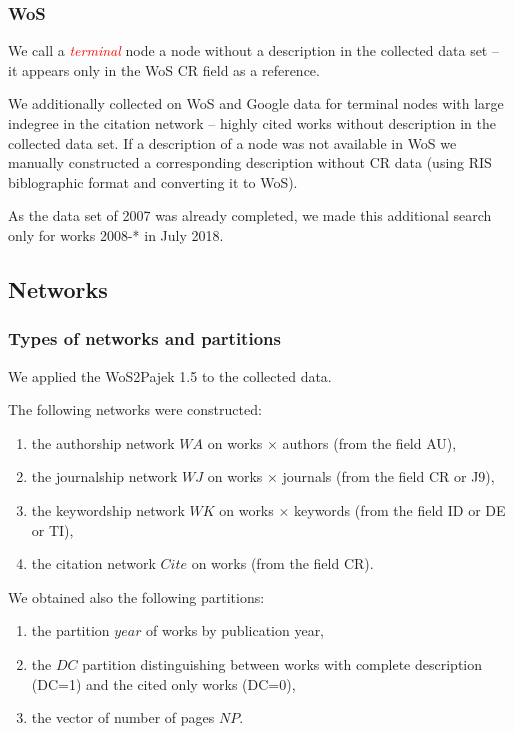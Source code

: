 \documentclass[hyperref={pdfstartview={FitBH -32768},
                         pdfpagemode=FullScreen,
                         plainpages=false,
                         colorlinks=true}
              ]{beamer}
\newcommand{\keyw}[1]{\textcolor{red}{\emph{#1}}}
\begin{document}
\begin{frame}[fragile]
\frametitle{WoS}
\small
We call a \keyw{terminal} node  a node without a description in the collected data set -- it appears only in the WoS CR field as a reference. \medskip

We additionally collected on WoS and Google data for terminal nodes with large indegree in the citation network -- highly cited works without description in the collected data set. If a description of a node was not available in WoS we manually constructed a corresponding description without CR data (using RIS biblographic format and converting it to WoS).\medskip

As the data set of 2007 was already completed, we made this additional search only for works 2008-* in July 2018. 
\end{frame}

\subsection{Networks}


\begin{frame}[fragile]
\frametitle{Types of networks and partitions}
\small
We applied the WoS2Pajek 1.5  to the collected data.\medskip

The following networks were constructed: 
\begin{enumerate}
\item the authorship network $WA$ on works $\times$ authors  (from the field AU), 
\item the journalship network $WJ$ on  works $\times$ journals  (from the field CR or J9), 
\item the keywordship network $WK$ on works  $\times$ keywords (from the field ID or DE or TI), 
\item the citation network $Cite$ on works (from the field CR).
\end{enumerate}

We obtained also the following partitions: 
\begin{enumerate}
\item the partition $year$ of works by publication year, 
\item the $DC$ partition distinguishing between works with complete description (DC=1) and the cited only works (DC=0),
\item the vector of number of pages $NP$.
\end{enumerate}
\end{frame}
\end{document}
